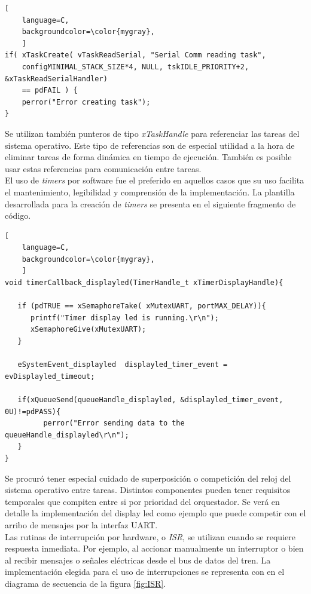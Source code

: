 \begin{lstlisting}[
	language=C, 
	backgroundcolor=\color{mygray},
	]
if( xTaskCreate( vTaskReadSerial, "Serial Comm reading task", 
    configMINIMAL_STACK_SIZE*4, NULL, tskIDLE_PRIORITY+2, &xTaskReadSerialHandler) 
    == pdFAIL ) {
    perror("Error creating task");
}
\end{lstlisting}

Se utilizan también punteros de tipo \textit{xTaskHandle} para referenciar las tareas del sistema operativo. Este tipo de referencias son de especial utilidad a la hora de eliminar tareas de forma dinámica en tiempo de ejecución. También es posible usar estas referencias para comunicación entre tareas.\\

El uso de \textit{timers} por software fue el preferido en aquellos casos que su uso facilita el mantenimiento, legibilidad y comprensión de la implementación. La plantilla desarrollada para la creación de \textit{timers} se presenta en el siguiente fragmento de código.

\begin{lstlisting}[
	language=C, 
	backgroundcolor=\color{mygray},
	]
void timerCallback_displayled(TimerHandle_t xTimerDisplayHandle){

   if (pdTRUE == xSemaphoreTake( xMutexUART, portMAX_DELAY)){
      printf("Timer display led is running.\r\n");
      xSemaphoreGive(xMutexUART);
   }

   eSystemEvent_displayled  displayled_timer_event = evDisplayled_timeout;
   
   if(xQueueSend(queueHandle_displayled, &displayled_timer_event, 0U)!=pdPASS){
         perror("Error sending data to the queueHandle_displayled\r\n");
   }
}

\end{lstlisting}

Se procuró tener especial cuidado de superposición o competición del reloj del sistema operativo entre tareas. Distintos componentes pueden tener requisitos temporales que compiten entre si por prioridad del orquestador. Se verá en detalle la implementación del display led como ejemplo que puede competir con el arribo de mensajes por la interfaz UART.\\

Las rutinas de interrupción por hardware, o \textit{ISR}, se utilizan cuando se requiere respuesta inmediata. Por ejemplo, al accionar manualmente un interruptor o bien al recibir mensajes o señales eléctricas desde el bus de datos del tren. La implementación elegida para el uso de interrupciones se representa con en el diagrama de secuencia de la figura \ref{fig:ISR}. \\

